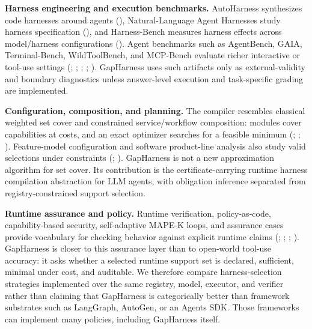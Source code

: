\documentclass[
  10pt,
]{article}
\begin{document}
\textbf{Harness engineering and execution benchmarks.} AutoHarness
synthesizes code harnesses around agents
(), Natural-Language
Agent Harnesses study harness specification
(), and
Harness-Bench measures harness effects across model/harness
configurations ().
Agent benchmarks such as AgentBench, GAIA, Terminal-Bench,
WildToolBench, and MCP-Bench evaluate richer interactive or tool-use
settings (;
;
;
;
). GapHarness uses such
artifacts only as external-validity and boundary diagnostics unless
answer-level execution and task-specific grading are implemented.

\textbf{Configuration, composition, and planning.} The compiler
resembles classical weighted set cover and constrained service/workflow
composition: modules cover capabilities at costs, and an exact optimizer
searches for a feasible minimum
(;
;
). Feature-model
configuration and software product-line analysis also study valid
selections under constraints (; ). GapHarness is not a new approximation algorithm for
set cover. Its contribution is the certificate-carrying runtime harness
compilation abstraction for LLM agents, with obligation inference
separated from registry-constrained support selection.

\textbf{Runtime assurance and policy.} Runtime verification,
policy-as-code, capability-based security, self-adaptive MAPE-K loops,
and assurance cases provide vocabulary for checking behavior against
explicit runtime claims
(; ;
;
). GapHarness is
closer to this assurance layer than to open-world tool-use accuracy: it
asks whether a selected runtime support set is declared, sufficient,
minimal under cost, and auditable. We therefore compare
harness-selection strategies implemented over the same registry, model,
executor, and verifier rather than claiming that GapHarness is
categorically better than framework substrates such as LangGraph,
AutoGen, or an Agents SDK. Those frameworks can implement many policies,
including GapHarness itself.
\end{document}
